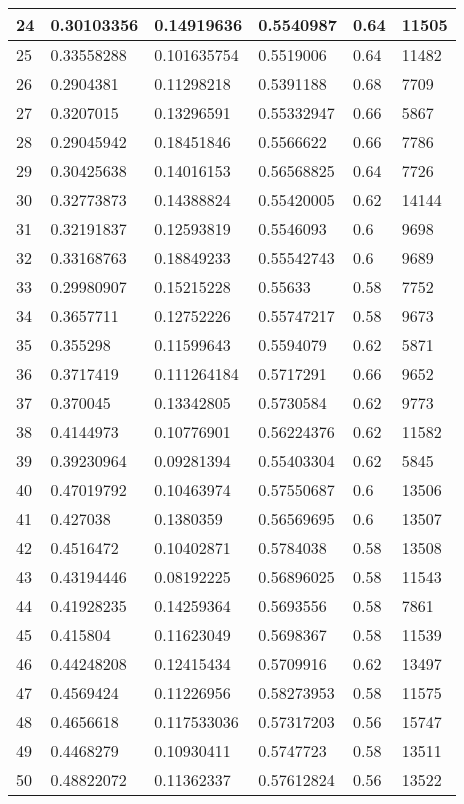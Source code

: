 \begin{longtable}{|l|l|l|l|l|l|}
24 & 0.30103356 & 0.14919636 & 0.5540987 & 0.64 & 11505 \\ \hline 
25 & 0.33558288 & 0.101635754 & 0.5519006 & 0.64 & 11482 \\ \hline 
26 & 0.2904381 & 0.11298218 & 0.5391188 & 0.68 & 7709 \\ \hline 
27 & 0.3207015 & 0.13296591 & 0.55332947 & 0.66 & 5867 \\ \hline 
28 & 0.29045942 & 0.18451846 & 0.5566622 & 0.66 & 7786 \\ \hline 
29 & 0.30425638 & 0.14016153 & 0.56568825 & 0.64 & 7726 \\ \hline 
30 & 0.32773873 & 0.14388824 & 0.55420005 & 0.62 & 14144 \\ \hline 
31 & 0.32191837 & 0.12593819 & 0.5546093 & 0.6 & 9698 \\ \hline 
32 & 0.33168763 & 0.18849233 & 0.55542743 & 0.6 & 9689 \\ \hline 
33 & 0.29980907 & 0.15215228 & 0.55633 & 0.58 & 7752 \\ \hline 
34 & 0.3657711 & 0.12752226 & 0.55747217 & 0.58 & 9673 \\ \hline 
35 & 0.355298 & 0.11599643 & 0.5594079 & 0.62 & 5871 \\ \hline 
36 & 0.3717419 & 0.111264184 & 0.5717291 & 0.66 & 9652 \\ \hline 
37 & 0.370045 & 0.13342805 & 0.5730584 & 0.62 & 9773 \\ \hline 
38 & 0.4144973 & 0.10776901 & 0.56224376 & 0.62 & 11582 \\ \hline 
39 & 0.39230964 & 0.09281394 & 0.55403304 & 0.62 & 5845 \\ \hline 
40 & 0.47019792 & 0.10463974 & 0.57550687 & 0.6 & 13506 \\ \hline 
41 & 0.427038 & 0.1380359 & 0.56569695 & 0.6 & 13507 \\ \hline 
42 & 0.4516472 & 0.10402871 & 0.5784038 & 0.58 & 13508 \\ \hline 
43 & 0.43194446 & 0.08192225 & 0.56896025 & 0.58 & 11543 \\ \hline 
44 & 0.41928235 & 0.14259364 & 0.5693556 & 0.58 & 7861 \\ \hline 
45 & 0.415804 & 0.11623049 & 0.5698367 & 0.58 & 11539 \\ \hline 
46 & 0.44248208 & 0.12415434 & 0.5709916 & 0.62 & 13497 \\ \hline 
47 & 0.4569424 & 0.11226956 & 0.58273953 & 0.58 & 11575 \\ \hline 
48 & 0.4656618 & 0.117533036 & 0.57317203 & 0.56 & 15747 \\ \hline 
49 & 0.4468279 & 0.10930411 & 0.5747723 & 0.58 & 13511 \\ \hline 
50 & 0.48822072 & 0.11362337 & 0.57612824 & 0.56 & 13522 \\ \hline 
\end{longtable}